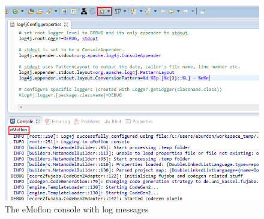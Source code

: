 \begin{stepbystep}
\begin{figure}[htbp]
	\centering
  \includegraphics[width=\textwidth]{../../org.moflon.doc.handbook.01_installation/2_simpleDemo/sd_images/eclipse_logger}
	\caption{The eMoflon console with log messages}
	\label{eclipse:logger}
\end{figure} 
\end{stepbystep}




